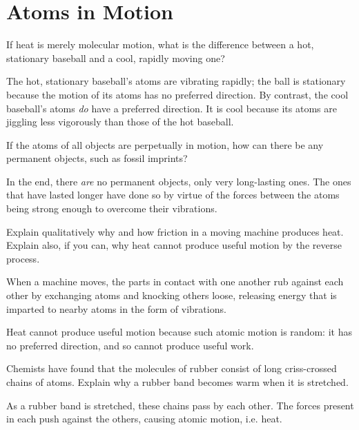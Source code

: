 \documentclass[../feynman-lectures-on-physics.tex]{subfiles}
\begin{document}
\section{Atoms in Motion}

\begin{questions}
	
\question If heat is merely molecular motion, what is the difference between a hot, stationary baseball and a cool, rapidly moving one?

\begin{solution}
	The hot, stationary baseball's atoms are vibrating rapidly; the ball is stationary because the motion of its atoms has no preferred direction. By contrast, the cool baseball's atoms \textit{do} have a preferred direction. It is cool because its atoms are jiggling less vigorously than those of the hot baseball.
\end{solution}

\question If the atoms of all objects are perpetually in motion, how can there be any permanent objects, such as fossil imprints?

\begin{solution}
	In the end, there \textit{are} no permanent objects, only very long-lasting ones. The ones that have lasted longer have done so by virtue of the forces between the atoms being strong enough to overcome their vibrations.
\end{solution}

\question Explain qualitatively why and how friction in a moving machine produces heat. Explain also, if you can, why heat cannot produce useful motion by the reverse process.

\begin{solution}
	When a machine moves, the parts in contact with one another rub against each other by exchanging atoms and knocking others loose, releasing energy that is imparted to nearby atoms in the form of vibrations.

	Heat cannot produce useful motion because such atomic motion is random: it has no preferred direction, and so cannot produce useful work.
\end{solution}

\question Chemists have found that the molecules of rubber consist of long criss-crossed chains of atoms. Explain why a rubber band becomes warm when it is stretched.

\begin{solution}
	As a rubber band is stretched, these chains pass by each other. The forces present in each push against the others, causing atomic motion, i.e. heat.
\end{solution}


\end{questions}
\end{document}
